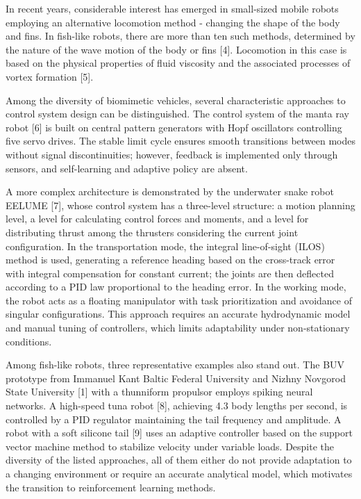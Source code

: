 \documentclass[12pt]{revtex4}
\begin{document}
In recent years, considerable interest has emerged in small-sized mobile robots employing an alternative locomotion method - changing the shape of the body and fins. In fish-like robots, there are more than ten such methods, determined by the nature of the wave motion of the body or fins [4]. Locomotion in this case is based on the physical properties of fluid viscosity and the associated processes of vortex formation [5].

Among the diversity of biomimetic vehicles, several characteristic approaches to control system design can be distinguished. The control system of the manta ray robot [6] is built on central pattern generators with Hopf oscillators controlling five servo drives. The stable limit cycle ensures smooth transitions between modes without signal discontinuities; however, feedback is implemented only through sensors, and self-learning and adaptive policy are absent.

A more complex architecture is demonstrated by the underwater snake robot EELUME [7], whose control system has a three-level structure: a motion planning level, a level for calculating control forces and moments, and a level for distributing thrust among the thrusters considering the current joint configuration. In the transportation mode, the integral line-of-sight (ILOS) method is used, generating a reference heading based on the cross-track error with integral compensation for constant current; the joints are then deflected according to a PID law proportional to the heading error. In the working mode, the robot acts as a floating manipulator with task prioritization and avoidance of singular configurations. This approach requires an accurate hydrodynamic model and manual tuning of controllers, which limits adaptability under non-stationary conditions.

Among fish-like robots, three representative examples also stand out. The BUV prototype from Immanuel Kant Baltic Federal University and Nizhny Novgorod State University [1] with a thunniform propulsor employs spiking neural networks. A high-speed tuna robot [8], achieving 4.3 body lengths per second, is controlled by a PID regulator maintaining the tail frequency and amplitude. A robot with a soft silicone tail [9] uses an adaptive controller based on the support vector machine method to stabilize velocity under variable loads. Despite the diversity of the listed approaches, all of them either do not provide adaptation to a changing environment or require an accurate analytical model, which motivates the transition to reinforcement learning methods.
\end{document}
